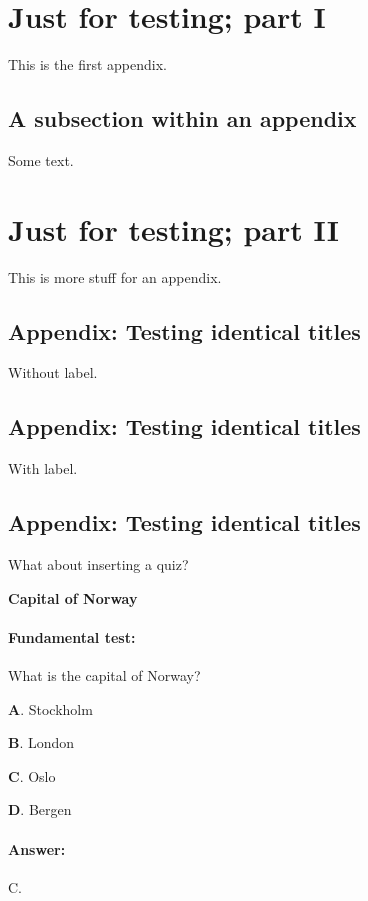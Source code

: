 \documentclass[%
oneside,                 %
final,                   %
10pt]{article}
\newenvironment{doconcequiz}{}{}
\newcounter{doconcequizcounter}
\theoremstyle{definition}
\begin{document}
\begin{enumerate}
\section{Just for testing; part I}
\label{app1}
This is the first appendix.
\subsection{A subsection within an appendix}
Some text.
\section{Just for testing; part II}
\label{app2}
This is more stuff for an appendix.
\subsection{Appendix: Testing identical titles}
Without label.
\subsection{Appendix: Testing identical titles}
\label{test:title:id1}
With label.
\subsection{Appendix: Testing identical titles}
\label{test:title:id2}
What about inserting a quiz?

\begin{doconcequiz}
\label{quiz:2}


\noindent\textbf{\large Capital of Norway}
\paragraph{Fundamental test:}
What is the capital of Norway?

\vspace{2mm}

\textbf{A}. 
Stockholm

\textbf{B}. 
London

\textbf{C}. 
Oslo

\textbf{D}. 
Bergen


\paragraph{Answer:} C.

\\



\end{doconcequiz}
\end{enumerate}
\end{document}
